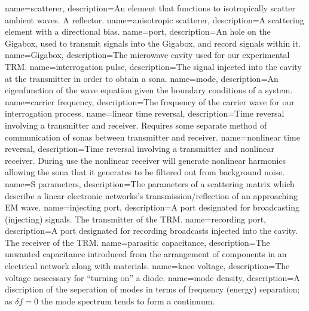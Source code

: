 {
   name=scatterer,
  description={An element that functions to isotropically scatter ambient waves. A reflector.}
}
{
   name=anisotropic scatterer,
  description={A scattering element with a directional bias.}
}
{
   name=port,
  description={An hole on the Gigabox, used to transmit signals into the Gigabox, and record signals within it.}
}
{
   name=Gigabox,
  description={The microwave cavity used for our experimental TRM.}
}
{
   name=interrogation pulse,
  description={The signal injected into the cavity at the transmitter in order to obtain a sona.}
}
{
   name=mode,
  description={An eigenfunction of the wave equation given the boundary conditions of a system.}
}
{
   name=carrier frequency,
  description={The frequency of the carrier wave for our interrogation process.}
}
{
   name=linear time reversal,
  description={Time reversal involving a transmitter and receiver.  Requires some separate method of communication of sonas between transmitter and receiver.}
}
{
   name=nonlinear time reversal,
  description={Time reversal involving a transmitter and nonlinear receiver.  During use the nonlinear receiver will generate nonlinear harmonics allowing the sona that it generates to be filtered out from background noise.}
}
{
   name=S parameters,
  description={The parameters of a scattering matrix which describe a linear electronic networks's transmission/reflection of an approaching EM wave.}
}
{
   name=injecting port,
  description={A port designated for broadcasting (injecting) signals. The transmitter of the TRM.}
}
{
   name=recording port,
  description={A port designated for recording broadcasts injected into the cavity. The receiver of the TRM.}
}
{
   name=parasitic capacitance,
  description={The unwanted capacitance introduced from the arrangement of components in an electrical network along with materials.}
}
{
   name=knee voltage,
  description={The voltage nescessary for ``turning on'' a diode.}
}
{
   name=mode density,
  description={A discription of the seperation of modes in terms of frequency (energy) separation; as $\delta f = 0$ the mode spectrum tends to form a continuum.}
}
